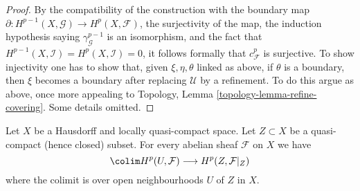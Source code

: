 \begin{proof}
\medskip\noindent
By the compatibility of the construction with the boundary map
$\partial : H^{p - 1}(X, \mathcal{G}) \to H^p(X, \mathcal{F})$,
the surjectivity of the map, the induction hypothesis saying
$\gamma^{p - 1}_\mathcal{G}$ is an isomorphism, and
the fact that $H^{p - 1}(X, \mathcal{I}) = H^p(X, \mathcal{I}) = 0$,
it follows formally that $c^p_\mathcal{F}$ is surjective.
To show injectivity one has to show that, given $\xi, \eta, \theta$
linked as above, if $\theta$ is a boundary, then $\xi$ becomes a
boundary after replacing $\mathcal{U}$ by a refinement. To do this
argue as above, once more appealing to
Topology, Lemma \ref{topology-lemma-refine-covering}. Some details omitted.
\end{proof}

\begin{lemma}
\label{lemma-cohomology-of-closed}
Let $X$ be a Hausdorff and locally quasi-compact space.
Let $Z \subset X$ be a quasi-compact (hence closed) subset.
For every abelian sheaf $\mathcal{F}$ on $X$ we have
$$
\colim H^p(U, \mathcal{F})
\longrightarrow
H^p(Z, \mathcal{F}|_Z)
$$
where the colimit is over open neighbourhoods $U$ of $Z$ in $X$.
\end{lemma}

